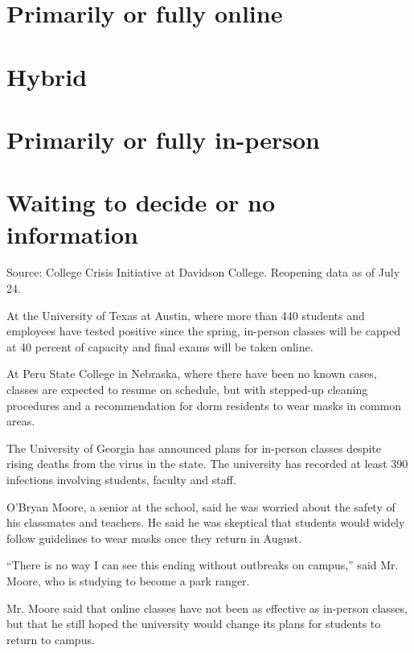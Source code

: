 \hypertarget{primarily-or-fully-online}{%
\section{Primarily or fully online}\label{primarily-or-fully-online}}

\hypertarget{hybrid}{%
\section{Hybrid}\label{hybrid}}

\hypertarget{primarily-or-fully-in-person}{%
\section{Primarily or fully
in-person}\label{primarily-or-fully-in-person}}

\hypertarget{waiting-to-decide-or-no-information}{%
\section{Waiting to decide or no
information}\label{waiting-to-decide-or-no-information}}

Source: College Crisis Initiative at Davidson College. Reopening data as
of July 24.

At the University of Texas at Austin, where more than 440 students and
employees have tested positive since the spring, in-person classes will
be capped at 40 percent of capacity and final exams will be taken
online.

At Peru State College in Nebraska, where there have been no known cases,
classes are expected to resume on schedule, but with stepped-up cleaning
procedures and a recommendation for dorm residents to wear masks in
common areas.

The University of Georgia has announced plans for in-person classes
despite rising deaths from the virus in the state. The university has
recorded at least 390 infections involving students, faculty and staff.

O'Bryan Moore, a senior at the school, said he was worried about the
safety of his classmates and teachers. He said he was skeptical that
students would widely follow guidelines to wear masks once they return
in August.

``There is no way I can see this ending without outbreaks on campus,''
said Mr. Moore, who is studying to become a park ranger.

Mr. Moore said that online classes have not been as effective as
in-person classes, but that he still hoped the university would change
its plans for students to return to campus.

